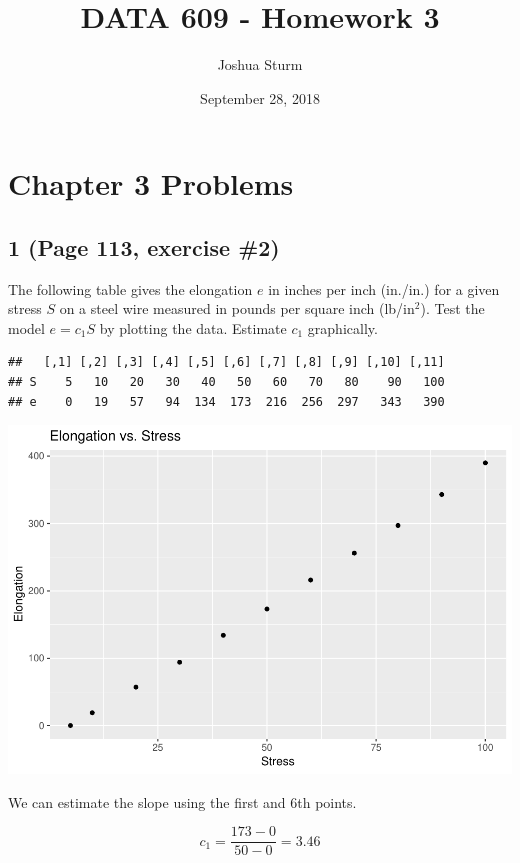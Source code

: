 \documentclass[]{article}
\title{DATA 609 - Homework 3}
\author{Joshua Sturm}
\date{September 28, 2018}
\begin{document}
\maketitle

\hypertarget{chapter-3-problems}{%
\section{Chapter 3 Problems}\label{chapter-3-problems}}

\hypertarget{page-113-exercise-2}{%
\subsection{1 (Page 113, exercise \#2)}\label{page-113-exercise-2}}

The following table gives the elongation \(e\) in inches per inch
(in./in.) for a given stress \(S\) on a steel wire measured in pounds
per square inch (lb/in\(^2\)). Test the model \(e = c_1S\) by plotting
the data. Estimate \(c_1\) graphically.

\begin{verbatim}
##   [,1] [,2] [,3] [,4] [,5] [,6] [,7] [,8] [,9] [,10] [,11]
## S    5   10   20   30   40   50   60   70   80    90   100
## e    0   19   57   94  134  173  216  256  297   343   390
\end{verbatim}

\includegraphics{Joshua_Sturm_Homework3_files/figure-latex/unnamed-chunk-1-1.pdf}

We can estimate the slope using the first and 6th points.

\begin{equation*}
c_1 = \frac{173 - 0}{50 - 0} = 3.46
\end{equation*}
\end{document}
